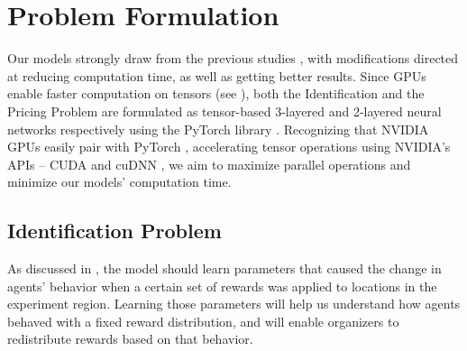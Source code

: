 \chapter{Problem Formulation} \label{sec:Problem Formulation}
Our models strongly draw from the previous studies \cite{Xue2016Avi2, Xue2016Avi1}, with modifications directed at reducing computation time, as well as getting better results. Since GPUs enable faster computation on tensors (see ), both the Identification and the Pricing Problem are formulated as tensor-based 3-layered and 2-layered neural networks respectively using the PyTorch library \cite{PTDocs}. Recognizing that NVIDIA GPUs easily pair with PyTorch \cite{PTDocs}, accelerating tensor operations using NVIDIA's APIs -- CUDA and cuDNN \cite{CUDADocs, cuDNNPaper}, we aim to maximize parallel operations and minimize our models' computation time.

\section{Identification Problem} \label{sec:Identification Problem}
As discussed in , the model should learn parameters that caused the change in agents' behavior when a certain set of rewards was applied to locations in the experiment region. Learning those parameters will help us understand how agents behaved with a fixed reward distribution, and will enable organizers to redistribute rewards based on that behavior.

